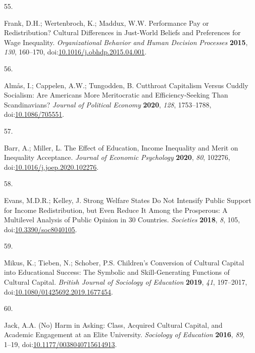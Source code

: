 \documentclass[
  12pt,
  letterpaper,
]{article}
\newlength{\cslhangindent}
\newlength{\csllabelwidth}
\newenvironment{CSLReferences}[2] %
 {\begin{list}{}{%
  \setlength{\itemindent}{0pt}
  \setlength{\leftmargin}{0pt}
  \setlength{\parsep}{0pt}
  \ifodd #1
   \setlength{\leftmargin}{\cslhangindent}
   \setlength{\itemindent}{-1\cslhangindent}
  \fi
  \setlength{\itemsep}{#2\baselineskip}}}
 {\end{list}}
\newcommand{\CSLLeftMargin}[1]{\parbox[t]{\csllabelwidth}{\strut#1\strut}}
\newcommand{\CSLRightInline}[1]{\parbox[t]{\linewidth - \csllabelwidth}{\strut#1\strut}}
\begin{document}
\begin{CSLReferences}{0}{0}
\CSLLeftMargin{55. }%
\CSLRightInline{Frank, D.H.; Wertenbroch, K.; Maddux, W.W. Performance
Pay or Redistribution? {Cultural} Differences in Just-World Beliefs and
Preferences for Wage Inequality. \emph{Organizational Behavior and Human
Decision Processes} \textbf{2015}, \emph{130}, 160--170,
doi:\href{https://doi.org/10.1016/j.obhdp.2015.04.001}{10.1016/j.obhdp.2015.04.001}.}

\CSLLeftMargin{56. }%
\CSLRightInline{Almås, I.; Cappelen, A.W.; Tungodden, B. Cutthroat
{Capitalism} Versus {Cuddly Socialism}: {Are Americans More
Meritocratic} and {Efficiency-Seeking} Than {Scandinavians}?
\emph{Journal of Political Economy} \textbf{2020}, \emph{128},
1753--1788, doi:\href{https://doi.org/10.1086/705551}{10.1086/705551}.}

\CSLLeftMargin{57. }%
\CSLRightInline{Barr, A.; Miller, L. The Effect of Education, Income
Inequality and Merit on Inequality Acceptance. \emph{Journal of Economic
Psychology} \textbf{2020}, \emph{80}, 102276,
doi:\href{https://doi.org/10.1016/j.joep.2020.102276}{10.1016/j.joep.2020.102276}.}

\CSLLeftMargin{58. }%
\CSLRightInline{Evans, M.D.R.; Kelley, J. Strong {Welfare States Do Not
Intensify Public Support} for {Income Redistribution}, but {Even Reduce
It} Among the {Prosperous}: {A Multilevel Analysis} of {Public Opinion}
in 30 {Countries}. \emph{Societies} \textbf{2018}, \emph{8}, 105,
doi:\href{https://doi.org/10.3390/soc8040105}{10.3390/soc8040105}.}

\CSLLeftMargin{59. }%
\CSLRightInline{Mikus, K.; Tieben, N.; Schober, P.S. Children's
Conversion of Cultural Capital into Educational Success: The Symbolic
and Skill-Generating Functions of Cultural Capital. \emph{British
Journal of Sociology of Education} \textbf{2019}, \emph{41}, 197--2017,
doi:\href{https://doi.org/10.1080/01425692.2019.1677454}{10.1080/01425692.2019.1677454}.}

\CSLLeftMargin{60. }%
\CSLRightInline{Jack, A.A. ({No}) {Harm} in {Asking}: {Class}, {Acquired
Cultural Capital}, and {Academic Engagement} at an {Elite University}.
\emph{Sociology of Education} \textbf{2016}, \emph{89}, 1--19,
doi:\href{https://doi.org/10.1177/0038040715614913}{10.1177/0038040715614913}.}


\end{CSLReferences}
\end{document}
